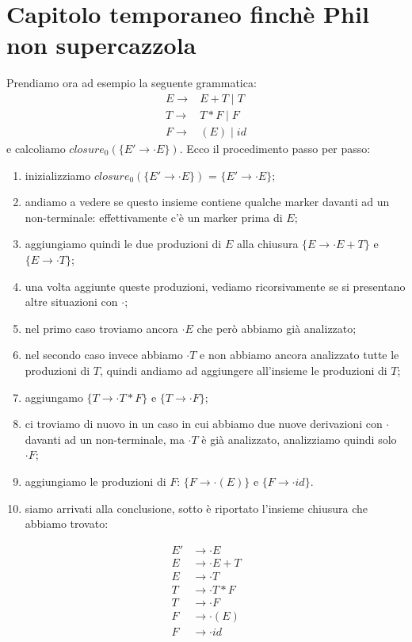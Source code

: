 \documentclass[class=book, crop=false, oneside, 12pt]{standalone}
\begin{document}
\chapter{Capitolo temporaneo finchè Phil non supercazzola}


Prendiamo ora ad esempio la seguente grammatica:
\begin{align*}
    E \to& E+T \mid T\\
    T \to& T*F \mid F\\
    F \to& (E) \mid id
\end{align*}
e calcoliamo \(closure_0 (\{E' \to \cdot E\})\). Ecco il procedimento passo per passo:
\begin{enumerate}
    \item inizializziamo \(closure_0 (\{E' \to \cdot E\})\) = \(\{E' \to \cdot E\}\); 
    \item andiamo a vedere se questo insieme contiene qualche marker davanti ad un non-terminale: effettivamente c'è un marker prima di \(E\);
    \item aggiungiamo quindi le due produzioni di \(E\) alla chiusura \(\{E \to \cdot E+T\}\) e \(\{E \to \cdot T\}\);
    \item una volta aggiunte queste produzioni, vediamo ricorsivamente se si presentano altre situazioni con \(\cdot\);
    \item nel primo caso troviamo ancora \(\cdot E\) che però abbiamo già analizzato;
    \item nel secondo caso invece abbiamo \(\cdot T\) e non abbiamo ancora analizzato tutte le produzioni di \(T\), quindi andiamo ad aggiungere all'insieme le produzioni di \(T\);
    \item aggiungamo \(\{T \to \cdot T * F\}\) e \(\{T \to \cdot F\}\);
    \item ci troviamo di nuovo in un caso in cui abbiamo due nuove derivazioni con \(\cdot\) davanti
    ad un non-terminale, ma \(\cdot T\) è già analizzato, analizziamo quindi solo \(\cdot F\);
    \item aggiungiamo le produzioni di \(F\): \(\{F \to \cdot (E)\}\) e \(\{F \to \cdot id \}\).
    \item siamo arrivati alla conclusione, sotto è riportato l'insieme chiusura che abbiamo trovato:
\end{enumerate}
\begin{align*}
    E'&\to \cdot E \\
    E  &\to \cdot E+T \\
    E  &\to \cdot T \\
    T  &\to \cdot T * F \\
    T  &\to \cdot F \\
    F  &\to \cdot (E) \\
    F  &\to \cdot id
\end{align*}
\end{document}
